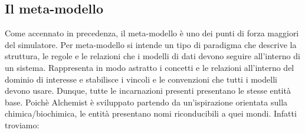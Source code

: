 \documentclass[12pt,a4paper,openright,twoside]{book}
\begin{document}
\subsection{Il meta-modello}

Come accennato in precedenza, il meta-modello è uno dei punti di forza maggiori del simulatore. 
Per meta-modello si intende un tipo di paradigma che descrive la struttura, le regole e le relazioni
che i modelli di dati devono seguire all’interno di un sistema. Rappresenta in modo astratto i 
concetti e le relazioni all’interno del dominio di interesse e stabilisce i vincoli e le convenzioni
che tutti i modelli devono usare. Dunque, tutte le incarnazioni presenti presentano le stesse entità
base. Poichè Alchemist è sviluppato partendo da un’ispirazione orientata sulla chimica/biochimica,
le entità presentano nomi riconducibili a quei mondi. Infatti troviamo:
\end{document}
